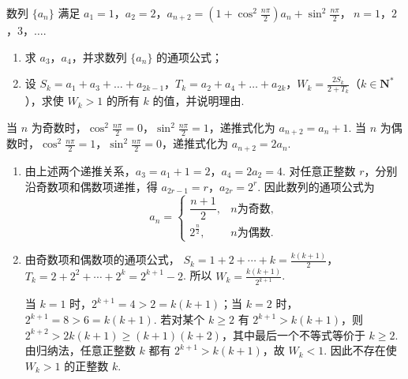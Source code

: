 \begin{problem}
数列 \(\{a_{n}\}\) 满足 \(a_1 = 1\)，\(a_2 = 2\)，\(a_{n+2} = \left(1 + \cos^2\frac{n\pi}{2}\right)a_n + \sin^2\frac{n\pi}{2}\)，\(\ n = 1\)，\(2\)，\(3\)，\(\dots\).
\begin{enumerate}
\item 求 \(a_{3}\)，\(a_{4}\)，并求数列 \(\{a_{n}\}\) 的通项公式；
\item 设 \(S_{k} = a_{1} + a_{3} + \dots + a_{2k-1}\)，\(T_{k} = a_{2} + a_{4} + \dots + a_{2k}\)，\(W_{k} = \frac{2S_{k}}{2 + T_{k}}\)（\(k \in \mathbf{N}^{*}\)），求使 \(W_{k} > 1\) 的所有 \(k\) 的值，并说明理由.
\end{enumerate}

\begin{solution}
当 \(n\) 为奇数时，\(\cos^2\frac{n\pi}{2}=0\)，\(\sin^2\frac{n\pi}{2}=1\)，递推式化为 \(a_{n+2}=a_n+1\). 当 \(n\) 为偶数时，\(\cos^2\frac{n\pi}{2}=1\)，\(\sin^2\frac{n\pi}{2}=0\)，递推式化为 \(a_{n+2}=2a_n\).

\begin{enumerate}
\item 由上述两个递推关系，\(a_3=a_1+1=2\)，\(a_4=2a_2=4\). 对任意正整数 \(r\)，分别沿奇数项和偶数项递推，得
\(a_{2r-1}=r\)，\(a_{2r}=2^r\). 因此数列的通项公式为
\[
a_n=
\begin{cases}
\dfrac{n+1}{2},&n\text{为奇数},\\
2^{\frac{n}{2}},&n\text{为偶数}.
\end{cases}
\]

\item 由奇数项和偶数项的通项公式，
\(S_k=1+2+\cdots+k=\frac{k\left(k+1\right)}{2}\)，
\(T_k=2+2^2+\cdots+2^k=2^{k+1}-2\). 所以
\(W_k=\frac{k\left(k+1\right)}{2^{k+1}}\).

当 \(k=1\) 时，\(2^{k+1}=4>2=k\left(k+1\right)\)；当 \(k=2\) 时，\(2^{k+1}=8>6=k\left(k+1\right)\). 若对某个 \(k\geqslant2\) 有 \(2^{k+1}>k\left(k+1\right)\)，则
\(2^{k+2}>2k\left(k+1\right)\geqslant\left(k+1\right)\left(k+2\right)\)，其中最后一个不等式等价于 \(k\geqslant2\). 由归纳法，任意正整数 \(k\) 都有 \(2^{k+1}>k\left(k+1\right)\)，故 \(W_k<1\). 因此不存在使 \(W_k>1\) 的正整数 \(k\).
\end{enumerate}
\end{solution}
\end{problem}

